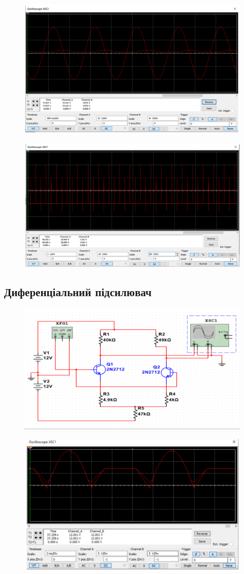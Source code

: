 \begin{figure}[ht]
\centering
\includegraphics[width=0.6\linewidth]{Pic/third_2.png}
\end{figure}

\begin{figure}[ht]
\centering
\includegraphics[width=0.6\linewidth]{Pic/third_3.png}
\end{figure}
\newpage

\subsection{Диференціальний підсилювач}
\setlength{\parindent}{4em}



\begin{figure}[ht]
\centering
\includegraphics[width=0.6\linewidth]{Pic/4_1.png}
\end{figure}


\begin{figure}[ht]
\centering
\includegraphics[width=0.7\linewidth]{Pic/4_2.png}
\end{figure}

\newpage
